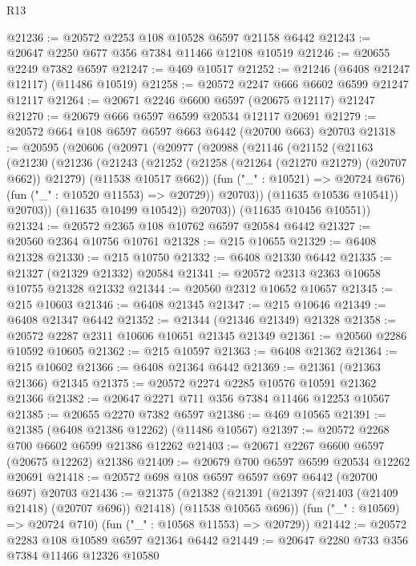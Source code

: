 \begin{lexlean}{R13}
\begin{coremodule}
@21236 := @20572 @2253 @108 @10528 @6597 @21158 @6442
@21243 := @20647 @2250 @677 @356 @7384 @11466 @12108 @10519
@21246 := @20655 @2249 @7382 @6597
@21247 := @469 @10517
@21252 := @21246 (@6408 @21247 @12117) (@11486 @10519)
@21258 := @20572 @2247 @666 @6602 @6599 @21247 @12117
@21264 := @20671 @2246 @6600 @6597 (@20675 @12117) @21247
@21270 := @20679 @666 @6597 @6599 @20534 @12117 @20691
@21279 := @20572 @664 @108 @6597 @6597 @663 @6442 (@20700 @663) @20703
@21318 := @20595
    (@20606
      (@20971
        (@20977
          (@20988
            (@21146
              (@21152
                (@21163
                  (@21230
                    (@21236
                      (@21243
                        (@21252
                          (@21258 (@21264 (@21270 @21279) (@20707 @662)) @21279)
                          (@11538 @10517 @662))
                        (fun ("_" : @10521) => @20724 @676)
                        (fun ("_" : @10520 @11553) => @20729))
                      @20703))
                  (@11635 @10536 @10541))
                @20703))
            (@11635 @10499 @10542))
          @20703))
      (@11635 @10456 @10551))
@21324 := @20572 @2365 @108 @10762 @6597 @20584 @6442
@21327 := @20560 @2364 @10756 @10761
@21328 := @215 @10655
@21329 := @6408 @21328
@21330 := @215 @10750
@21332 := @6408 @21330 @6442
@21335 := @21327 (@21329 @21332) @20584
@21341 := @20572 @2313 @2363 @10658 @10755 @21328 @21332
@21344 := @20560 @2312 @10652 @10657
@21345 := @215 @10603
@21346 := @6408 @21345
@21347 := @215 @10646
@21349 := @6408 @21347 @6442
@21352 := @21344 (@21346 @21349) @21328
@21358 := @20572 @2287 @2311 @10606 @10651 @21345 @21349
@21361 := @20560 @2286 @10592 @10605
@21362 := @215 @10597
@21363 := @6408 @21362
@21364 := @215 @10602
@21366 := @6408 @21364 @6442
@21369 := @21361 (@21363 @21366) @21345
@21375 := @20572 @2274 @2285 @10576 @10591 @21362 @21366
@21382 := @20647 @2271 @711 @356 @7384 @11466 @12253 @10567
@21385 := @20655 @2270 @7382 @6597
@21386 := @469 @10565
@21391 := @21385 (@6408 @21386 @12262) (@11486 @10567)
@21397 := @20572 @2268 @700 @6602 @6599 @21386 @12262
@21403 := @20671 @2267 @6600 @6597 (@20675 @12262) @21386
@21409 := @20679 @700 @6597 @6599 @20534 @12262 @20691
@21418 := @20572 @698 @108 @6597 @6597 @697 @6442 (@20700 @697) @20703
@21436 := @21375
    (@21382
      (@21391 (@21397 (@21403 (@21409 @21418) (@20707 @696)) @21418) (@11538 @10565 @696))
      (fun ("_" : @10569) => @20724 @710)
      (fun ("_" : @10568 @11553) => @20729))
@21442 := @20572 @2283 @108 @10589 @6597 @21364 @6442
@21449 := @20647 @2280 @733 @356 @7384 @11466 @12326 @10580

\end{coremodule}
\end{lexlean}
